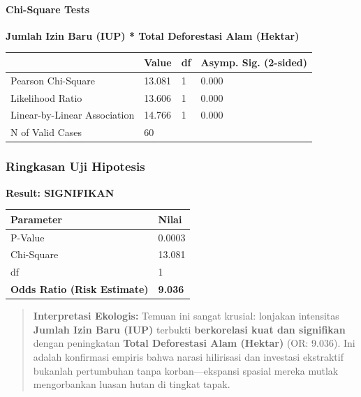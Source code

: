 \documentclass[
]{article}
\newcounter{none} %
\begin{document}
\paragraph{Chi-Square Tests}\label{chi-square-tests}

\textbf{Jumlah Izin Baru (IUP) * Total Deforestasi Alam (Hektar)}

{\def\LTcaptype{none} %
\begin{longtable}[]{@{}llll@{}}
\toprule\noalign{}
& Value & df & Asymp. Sig. (2-sided) \\
\midrule\noalign{}
\endhead
\bottomrule\noalign{}
\endlastfoot
Pearson Chi-Square & 13.081 & 1 & 0.000 \\
Likelihood Ratio & 13.606 & 1 & 0.000 \\
Linear-by-Linear Association & 14.766 & 1 & 0.000 \\
N of Valid Cases & 60 & & \\
\end{longtable}
}

\subsubsection{Ringkasan Uji Hipotesis}\label{ringkasan-uji-hipotesis}

\textbf{Result: SIGNIFIKAN}

{\def\LTcaptype{none} %
\begin{longtable}[]{@{}ll@{}}
\toprule\noalign{}
Parameter & Nilai \\
\midrule\noalign{}
\endhead
\bottomrule\noalign{}
\endlastfoot
P-Value & 0.0003 \\
Chi-Square & 13.081 \\
df & 1 \\
\textbf{Odds Ratio (Risk Estimate)} & \textbf{9.036} \\
\end{longtable}
}

\begin{quote}
\textbf{Interpretasi Ekologis:} Temuan ini sangat krusial: lonjakan
intensitas \textbf{Jumlah Izin Baru (IUP)} terbukti \textbf{berkorelasi
kuat dan signifikan} dengan peningkatan \textbf{Total Deforestasi Alam
(Hektar)} (OR: 9.036). Ini adalah konfirmasi empiris bahwa narasi
hilirisasi dan investasi ekstraktif bukanlah pertumbuhan tanpa
korban---ekspansi spasial mereka mutlak mengorbankan luasan hutan di
tingkat tapak.
\end{quote}
\end{document}
